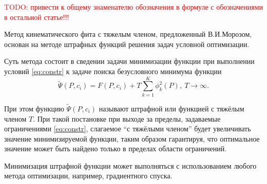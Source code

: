 
\textcolor{red}{TODO: привести к общему знаменателю обозначения в формуле с обозначениями в остальной статье!!!}

Метод кинематического фита с тяжелым членом, предложенный В.И.Морозом, основан на методе штрафных функций решения задач условной оптимизации.

Суть метода состоит в сведении задачи минимизации функции \label{track_fit} при выполнении условий \eqref{eq:constr} к задаче поиска безусловного минимума функции
\begin{equation}
 \tilde{\Psi}(P, c_i) = F(P, c_i) + T\sum_{k=1}^{K}\phi_k^2(P),~T \rightarrow \infty.
\end{equation}

При этом функцию $ \tilde{\Psi}(P, c_i)$ называют штрафной или функцией с тяжёлым членом $T$. При такой постановке при выходе за пределы, задаваемые ограничениями \eqref{eq:constr}, слагаемое ``с тяжёлыми членом'' будет увеличивать значение минимизируемой функции, таким образом гарантируя, что оптимальное значение может быть найдено только в пределах области ограничений.

Минимизация штрафной функции может выполняться с использованием любого метода оптимизации, например, градиентного спуска.
